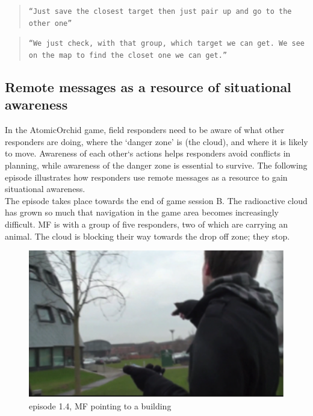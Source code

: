 \begin{quote}
\texttt{``Just save the closest target then just pair up and go to the other one'' }
\end{quote}

\begin{quote}
\texttt{``We just check, with that group, which target we can get. We see on the map to find the closet one we can get.''}
\end{quote}




\subsection{Remote messages as a resource of situational awareness} \label{sec:study1awareness}
In the AtomicOrchid game, field responders need to be aware of what other responders are doing, where the `danger zone' is (the cloud), and where it is likely to move. Awareness of each other`s actions helps responders avoid conflicts in planning, while awareness of the danger zone is essential to survive. The following episode illustrates how responders use remote messages as a resource to gain situational awareness.\\

The episode takes place towards the end of game session B. The radioactive cloud has grown so much that navigation in the game area becomes increasingly difficult. MF is with a group of five responders, two of which are carrying an animal. The cloud is blocking their way towards the drop off zone; they stop.\\

\begin{figure}[h]
  \centering
  \includegraphics[width=1\textwidth]{img/study1/ep3/ep31}
  \caption{episode 1.4, MF pointing to a building}
  \label{fig:study1ep31}
\end{figure}

